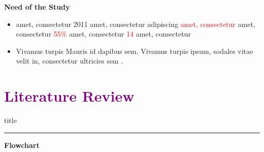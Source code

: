 \documentclass[aspectratio=169]{beamer}
\begin{document}
\begin{frame}{\textcolor{cmindsblue}{\textbf{Need of the Study}}}
    \vspace{-1cm}
\begin{itemize}
        \item amet, consectetur \textcolor{cmindsblue}{2011} amet, consectetur adipiscing \textcolor{red}{amet, consectetur} amet, consectetur \textcolor{red}{55\%} amet, consectetur \textcolor{red}{14} amet, consectetur \cite{Koh-2014}
        \item \textcolor{cmindsblue}{Vivamus turpis} Mauris id dapibus sem. Vivamus turpis ipsum, sodales vitae velit in, consectetur ultricies sem \cite{Hussain-2021}. 
        
    \end{itemize}

\end{frame}


\section{\textbf{\textcolor{purple}{Literature Review}}}
    \begin{frame}[plain]
        \vfill
      \centering
      \begin{beamercolorbox}[sep=8pt,center,shadow=true,rounded=true]{title}
        \insertsectionhead\par%
        \color{oxfordblue}\noindent\rule{10cm}{1pt}
      \end{beamercolorbox}
      \vfill
  \end{frame}


\begin{frame}{\textcolor{cmindsblue}{\textbf{Flowchart}}}
    \vspace{-0.8cm}

\end{frame}
\end{document}
